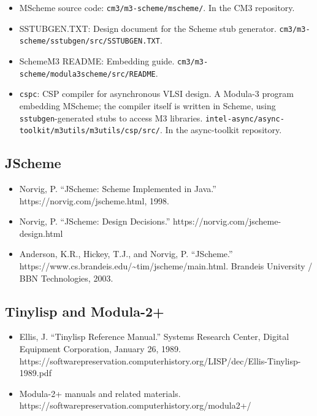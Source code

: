 \documentclass[
  12pt,
]{report}
\newcommand{\passthrough}[1]{#1}
\begin{document}
\begin{itemize}
\item
  MScheme source code: \passthrough{\lstinline!cm3/m3-scheme/mscheme/!}.
  In the CM3 repository.
\item
  SSTUBGEN.TXT: Design document for the Scheme stub generator.
  \passthrough{\lstinline!cm3/m3-scheme/sstubgen/src/SSTUBGEN.TXT!}.
\item
  SchemeM3 README: Embedding guide.
  \passthrough{\lstinline!cm3/m3-scheme/modula3scheme/src/README!}.
\item
  \passthrough{\lstinline!cspc!}: CSP compiler for asynchronous VLSI
  design. A Modula-3 program embedding MScheme; the compiler itself is
  written in Scheme, using \passthrough{\lstinline!sstubgen!}-generated
  stubs to access M3 libraries.
  \passthrough{\lstinline!intel-async/async-toolkit/m3utils/m3utils/csp/src/!}.
  In the async-toolkit repository.
\end{itemize}

\subsection{JScheme}\label{jscheme}

\begin{itemize}
\item
  Norvig, P. ``JScheme: Scheme Implemented in Java.''
  https://norvig.com/jscheme.html, 1998.
\item
  Norvig, P. ``JScheme: Design Decisions.''
  https://norvig.com/jscheme-design.html
\item
  Anderson, K.R., Hickey, T.J., and Norvig, P. ``JScheme.''
  https://www.cs.brandeis.edu/\textasciitilde tim/jscheme/main.html.
  Brandeis University / BBN Technologies, 2003.
\end{itemize}

\subsection{Tinylisp and Modula-2+}\label{tinylisp-and-modula-2}

\begin{itemize}
\item
  Ellis, J. ``Tinylisp Reference Manual.'' Systems Research Center,
  Digital Equipment Corporation, January 26, 1989.
  https://softwarepreservation.computerhistory.org/LISP/dec/Ellis-Tinylisp-1989.pdf
\item
  Modula-2+ manuals and related materials.
  https://softwarepreservation.computerhistory.org/modula2+/
\end{itemize}
\end{document}
